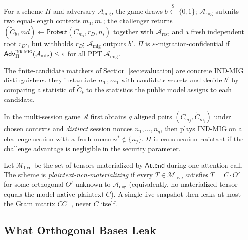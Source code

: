 \begin{definition}
\label{def:indmig}
For a scheme $\Pi$ and adversary $\mathcal{A}_{\mathrm{mig}}$, the game draws
$b\xleftarrow{\$}\{0,1\}$; $\mathcal{A}_{\mathrm{mig}}$ submits two equal-length
contexts $m_0,m_1$; the challenger returns
$(\tilde C_b,\mathit{md})\gets\mathsf{Protect}(C_{m_b},r_D,n_s)$ together with
$\mathcal{A}_{\mathrm{rest}}$ and a fresh independent root $r_{D'}$, but withholds
$r_D$; $\mathcal{A}_{\mathrm{mig}}$ outputs $b'$. $\Pi$ is
$\varepsilon$-migration-confidential if
$\mathsf{Adv}^{\textsc{ind-mig}}_{\Pi}(\mathcal{A}_{\mathrm{mig}})\le\varepsilon$
for all PPT $\mathcal{A}_{\mathrm{mig}}$.
\end{definition}

The finite-candidate matchers of Section~\ref{sec:evaluation} are concrete
\textsc{IND-MIG} distinguishers: they instantiate $m_0,m_1$ with candidate secrets
and decide $b'$ by comparing a statistic of $\tilde C_b$ to the statistics the
public model assigns to each candidate.

\begin{definition}
\label{def:session}
In the multi-session game $\mathcal{A}$ first obtains $q$ aligned pairs
$(C_{m_j},\tilde C_{m_j})$ under chosen contexts and \emph{distinct} session nonces
$n_1,\dots,n_q$, then plays \textsc{IND-MIG} on a challenge session with a fresh
nonce $n^\ast\notin\{n_j\}$. $\Pi$ is cross-session resistant if the challenge
advantage is negligible in the security parameter.
\end{definition}

\begin{definition}
\label{def:inuse}
Let $\mathcal{M}_{\mathrm{live}}$ be the set of tensors materialized by
$\mathsf{Attend}$ during one attention call. The scheme is
\emph{plaintext-non-materializing} if every $T\in\mathcal{M}_{\mathrm{live}}$
satisfies $T=C\cdot O'$ for some orthogonal $O'$ unknown to
$\mathcal{A}_{\mathrm{mig}}$ (equivalently, no materialized tensor equals the
model-native plaintext $C$). A single live snapshot then leaks at most the Gram
matrix $CC^\top$, never $C$ itself.
\end{definition}

\subsection{What Orthogonal Bases Leak}
\label{sec:theory-impossible}

